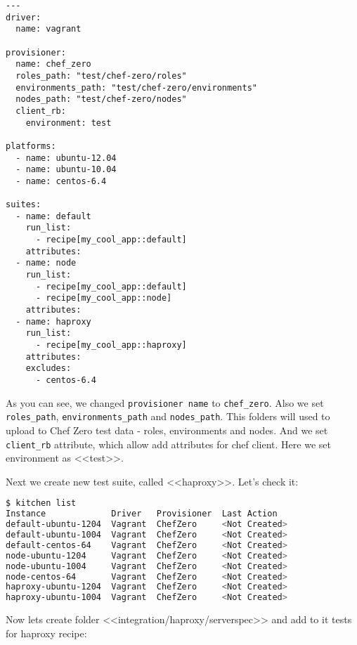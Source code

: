 \begin{lstlisting}[label=lst:testing-chef-zero17]
---
driver:
  name: vagrant

provisioner:
  name: chef_zero
  roles_path: "test/chef-zero/roles"
  environments_path: "test/chef-zero/environments"
  nodes_path: "test/chef-zero/nodes"
  client_rb:
    environment: test

platforms:
  - name: ubuntu-12.04
  - name: ubuntu-10.04
  - name: centos-6.4

suites:
  - name: default
    run_list:
      - recipe[my_cool_app::default]
    attributes:
  - name: node
    run_list:
      - recipe[my_cool_app::default]
      - recipe[my_cool_app::node]
    attributes:
  - name: haproxy
    run_list:
      - recipe[my_cool_app::haproxy]
    attributes:
    excludes:
      - centos-6.4
\end{lstlisting}

As you can see, we changed \lstinline!provisioner name! to \lstinline!chef_zero!. Also we set \lstinline!roles_path!, \lstinline!environments_path! and \lstinline!nodes_path!. This folders will used to upload to Chef Zero test data - roles, environments and nodes. And we set \lstinline!client_rb! attribute, which allow add attributes for chef client. Here we set environment as <<test>>.

Next we create new test suite, called <<haproxy>>. Let's check it:

\begin{lstlisting}[language=Bash,label=lst:testing-chef-zero18]
$ kitchen list
Instance             Driver   Provisioner  Last Action
default-ubuntu-1204  Vagrant  ChefZero     <Not Created>
default-ubuntu-1004  Vagrant  ChefZero     <Not Created>
default-centos-64    Vagrant  ChefZero     <Not Created>
node-ubuntu-1204     Vagrant  ChefZero     <Not Created>
node-ubuntu-1004     Vagrant  ChefZero     <Not Created>
node-centos-64       Vagrant  ChefZero     <Not Created>
haproxy-ubuntu-1204  Vagrant  ChefZero     <Not Created>
haproxy-ubuntu-1004  Vagrant  ChefZero     <Not Created>
\end{lstlisting}

Now lets create folder <<integration/haproxy/serverspec>> and add to it tests for haproxy recipe:

